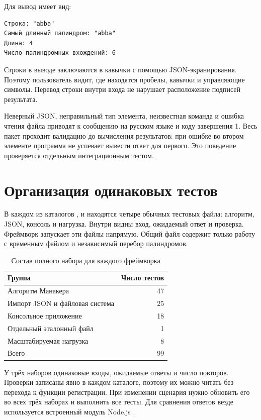 Для  вывод имеет вид:
\begin{Verbatim}[fontsize=\small,frame=single]
Строка: "abba"
Самый длинный палиндром: "abba"
Длина: 4
Число палиндромных вхождений: 6
\end{Verbatim}
Строки в выводе заключаются в кавычки с помощью JSON-экранирования. Поэтому пользователь видит, где находятся пробелы, кавычки и управляющие символы. Перевод строки внутри входа не нарушает расположение подписей результата.

Неверный JSON, неправильный тип элемента, неизвестная команда и ошибка чтения файла приводят к сообщению на русском языке и коду завершения 1. Весь пакет проходит валидацию до вычисления результатов: при ошибке во втором элементе программа не успевает вывести ответ для первого. Это поведение проверяется отдельным интеграционным тестом.

\section{Организация одинаковых тестов}
В каждом из каталогов ,  и  находятся четыре обычных тестовых файла: алгоритм, JSON, консоль и нагрузка. Внутри видны вход, ожидаемый ответ и проверка. Фреймворк запускает эти файлы напрямую. Общий файл  содержит только работу с временным файлом и независимый перебор палиндромов.

\begin{table}[H]\centering
\caption{Состав полного набора для каждого фреймворка}
\begin{tabular}{lr}\toprule
Группа & Число тестов\\\midrule
Алгоритм Манакера & 47\\
Импорт JSON и файловая система & 25\\
Консольное приложение & 18\\
Отдельный эталонный файл & 1\\
Масштабируемая нагрузка & 8\\\midrule
Всего & 99\\\bottomrule
\end{tabular}
\end{table}

У трёх наборов одинаковые входы, ожидаемые ответы и число повторов. Проверки записаны явно в каждом каталоге, поэтому их можно читать без перехода к функции регистрации. При изменении сценария нужно обновить его во всех трёх наборах и выполнить все тесты. Для сравнения ответов везде используется встроенный модуль Node.js .

